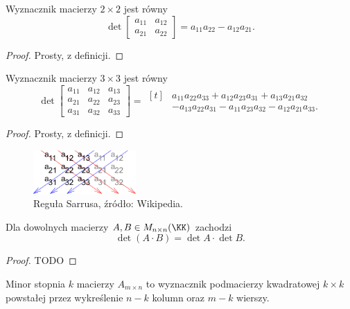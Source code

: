 \begin{theorem}
    Wyznacznik macierzy $2 \times 2$ jest równy
    \[ \det\begin{bmatrix}
        a_{11} & a_{12} \\
        a_{21} & a_{22}
    \end{bmatrix} = a_{11}a_{22} - a_{12}a_{21}. \]
\end{theorem}
\begin{proof}
    Prosty, z definicji.
\end{proof}

\begin{theorem}
    Wyznacznik macierzy $3 \times 3$ jest równy
    \[ \det\begin{bmatrix}
        a_{11} & a_{12} & a_{13} \\
        a_{21} & a_{22} & a_{23} \\
        a_{31} & a_{32} & a_{33}
    \end{bmatrix} = \begin{aligned}[t] &a_{11}a_{22}a_{33} + a_{12}a_{23}a_{31} + a_{13}a_{21}a_{32} \\
                                       &- a_{13}a_{22}a_{31} - a_{11}a_{23}a_{32} - a_{12}a_{21}a_{33}.\end{aligned} \]
\end{theorem}
\begin{proof}
    Prosty, z definicji.
\end{proof}

\begin{figure}[h]
    \centering
    \includegraphics[width=0.35\textwidth]{Sarrus_rule.pdf}
    \caption{Reguła Sarrusa, źródło: Wikipedia.}
\end{figure}

\begin{theorem}
    \label{t:det is multiplicative}
    Dla dowolnych macierzy $A, B \in M_{n\times n}(\KK)$ zachodzi
    \[ \det(A\cdot B) = \det A \cdot \det B. \]
\end{theorem}
\begin{proof}
    TODO
\end{proof}

\begin{definition}
    Minor stopnia $k$ macierzy $A_{m\times n}$ to wyznacznik podmacierzy kwadratowej $k\times k$ powstałej przez wykreślenie $n-k$ kolumn oraz $m-k$ wierszy.
\end{definition}

